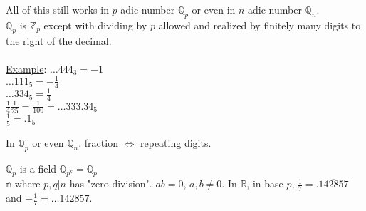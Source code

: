     All of this still works in $p$-adic number $\mathbb{Q}_p$ or even
    in $n$-adic number $\mathbb{Q}_n$.\\
    $\mathbb{Q}_p$ is $\mathbb{Z}_p$ except with dividing by $p$ allowed and
    realized by finitely many digits to the right of the decimal.\\\\
    \underline{Example}: $\ldots 444_3 = -1$\\
    $\ldots 111_5 = -\frac{1}{4}$\\
    $\ldots 334_5 = \frac{1}{4}$\\
    $\frac{1}{4}\frac{1}{25} = \frac{1}{100} = \ldots 333.34_5$\\
    $\frac{1}{5} = .1_5$\\
    \begin{theorem}
      In $\mathbb{Q}_p$ or even $\mathbb{Q}_n$. fraction $\Leftrightarrow$
      repeating digits.
    \end{theorem}
    $\mathbb{Q}_p$ is a field $\mathbb{Q}_{p^k} = \mathbb{Q}_p$\\
    $\mathbb{n}$ where $p,q | n$ has "zero division". $ab = 0$, $a, b \not= 
    0$.
    In $\mathbb{R}$, in base $p$, $\frac{1}{7} = .\overline{142857}$ and 
    $-\frac{1}{7} = \ldots 142857$.
